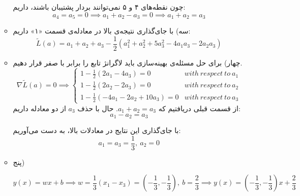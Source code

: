 \begin{itemize}
\begin{itemize}
\begin{figure}[hbpt!]
		\end{figure}
				چون نقطه‌‌های ۴ و ۵ نمی‌توانند بردار پشتیبان باشند، داریم:
	$$
	a_4 = a_5 = 0 \implies a_1 + a_2 - a_3   = 0 \implies a_1 + a_2 = a_3
	$$
		\item سه)
		با جای‌گذاری نتیجه‌ی بالا در معادله‌ی قسمت «۱» داریم:
		$$
		\tilde{L}(a) = a_1 + a_2 + a_3 - \frac{1}{2}(a_1^2 + a_2^2 + 5a_3^2 - 4a_1a_3 - 2a_2a_3)
		$$
		
		\item چهار) 
		برای حل مسئله‌ی بهینه‌سازی باید لاگرانژ تابع را برابر با صفر قرار دهیم.
		$$
		\nabla \tilde{L}(a) = 0 \implies \begin{cases}
		 1 - \frac{1}{2}(2a_1 - 4a_3) = 0 & with \: respect \: to \: a_{1} \\
 		 1 - \frac{1}{2}(2a_2 - 2a_3) = 0 & with \: respect \: to \: a_{2} \\
 		 1 - \frac{1}{2}(-4a_1 - 2a_2 + 10a_3) = 0 & with \: respect \: to \: a_{3}
		\end{cases}
		$$
		از قسمت قبلی دریافتیم که $a_1 + a_2 = a_3$. حال با حذف $a_3$ از دو معادله داریم:
		$$
		a_1 - a_2 = a_3
		$$
		
		با جای‌گذاری این نتایج در معادلات بالا، به دست‌ می‌آوریم:
		$$
		a_1 = a_3 = \frac{1}{3}, \: a_2 = 0
		$$
		
		\item پنج)
		
		$$
		y(x) = wx + b \implies w = \frac{1}{3}(x_1 - x_3) = (-\frac{1}{3}, -\frac{1}{3}), \: b = \frac{2}{3} \implies y(x) = (-\frac{1}{3}, -\frac{1}{3})x + \frac{2}{3}
		$$
	\end{itemize}
\end{itemize}
